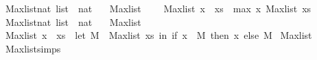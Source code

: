 \begin{isabellebody}
\isanewline
{}\isamarkupfalse%
\ Max{\isacharunderscore}{\kern0pt}list{\isacharprime}{\kern0pt}{\isacharcolon}{\kern0pt}{\isacharcolon}{\kern0pt}{\isachardoublequoteopen}nat\ list\ {\isasymRightarrow}\ nat{\isachardoublequoteclose}\ \isanewline
\ \ {\isachardoublequoteopen}Max{\isacharunderscore}{\kern0pt}list{\isacharprime}{\kern0pt}\ {\isacharbrackleft}{\kern0pt}{\isacharbrackright}{\kern0pt}\ {\isacharequal}{\kern0pt}\ {}{\isachardoublequoteclose}\isanewline
{\isacharbar}{\kern0pt}\ {\isachardoublequoteopen}Max{\isacharunderscore}{\kern0pt}list{\isacharprime}{\kern0pt}\ {\isacharparenleft}{\kern0pt}x\ {\isacharhash}{\kern0pt}\ xs{\isacharparenright}{\kern0pt}\ {\isacharequal}{\kern0pt}\ max\ x\ {\isacharparenleft}{\kern0pt}Max{\isacharunderscore}{\kern0pt}list{\isacharprime}{\kern0pt}\ xs{\isacharparenright}{\kern0pt}{\isachardoublequoteclose}\isanewline
\isanewline
{}\isamarkupfalse%
\ Max{\isacharunderscore}{\kern0pt}list{\isacharprime}{\kern0pt}{\isacharprime}{\kern0pt}{\isacharcolon}{\kern0pt}{\isacharcolon}{\kern0pt}{\isachardoublequoteopen}nat\ list\ {\isasymRightarrow}\ nat{\isachardoublequoteclose}\ \isanewline
\ \ {\isachardoublequoteopen}Max{\isacharunderscore}{\kern0pt}list{\isacharprime}{\kern0pt}{\isacharprime}{\kern0pt}\ {\isacharbrackleft}{\kern0pt}{\isacharbrackright}{\kern0pt}\ {\isacharequal}{\kern0pt}\ {}{\isachardoublequoteclose}\isanewline
{\isacharbar}{\kern0pt}\ {\isachardoublequoteopen}Max{\isacharunderscore}{\kern0pt}list{\isacharprime}{\kern0pt}{\isacharprime}{\kern0pt}\ {\isacharparenleft}{\kern0pt}x\ {\isacharhash}{\kern0pt}\ xs{\isacharparenright}{\kern0pt}\ {\isacharequal}{\kern0pt}\ {\isacharparenleft}{\kern0pt}let\ M\ {\isacharequal}{\kern0pt}\ Max{\isacharunderscore}{\kern0pt}list\ xs\ in\ {\isacharparenleft}{\kern0pt}if\ x\ {\isasymge}\ M\ then\ x\ else\ M{\isacharparenright}{\kern0pt}{\isacharparenright}{\kern0pt}{\isachardoublequoteclose}\isanewline
\isanewline
{}\isamarkupfalse%
\ {\isachardoublequoteopen}Max{\isacharunderscore}{\kern0pt}list\ {\isacharbrackleft}{\kern0pt}{}{\isacharcomma}{\kern0pt}{}{\isacharcomma}{\kern0pt}{}{\isacharcomma}{\kern0pt}{}{\isacharcomma}{\kern0pt}{}{\isacharcomma}{\kern0pt}{}{\isacharbrackright}{\kern0pt}{\isachardoublequoteclose}\isanewline
\isanewline
{}\isamarkupfalse%
\ Max{\isacharunderscore}{\kern0pt}list{\isachardot}{\kern0pt}simps\isanewline
\isanewline
%
\isadelimtheory
\isanewline
%
\endisadelimtheory
%
\isatagtheory
{}\isamarkupfalse%
%
\endisatagtheory
{\isafoldtheory}%
%
\isadelimtheory
%
\endisadelimtheory
%
\end{isabellebody}%
